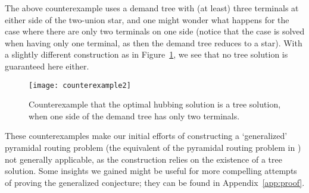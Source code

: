 The above counterexample uses a demand tree with (at least) three terminals at either side of the two-union star, and one might wonder what happens for the case where there are only two terminals on one side (notice that the case is solved when having only one terminal, as then the demand tree reduces to a star).
With a slightly different construction as in Figure~\ref{fig:counterex2}, we see that no tree solution is guaranteed here either. %

\begin{figure}
    \centering
    \texttt{[image: counterexample2]}
    \caption{Counterexample that the optimal hubbing solution is a tree solution, when one side of the demand tree has only two terminals.}
    \label{fig:counterex2}
\end{figure}

These counterexamples make our initial efforts of constructing a `generalized' pyramidal routing problem (the equivalent of the pyramidal routing problem in \cite{grandoni2008short}) not generally applicable, as the construction relies on the existence of a tree solution.
Some insights we gained might be useful for more compelling attempts of proving the generalized conjecture; they can be found in Appendix~\ref{app:proof}.
